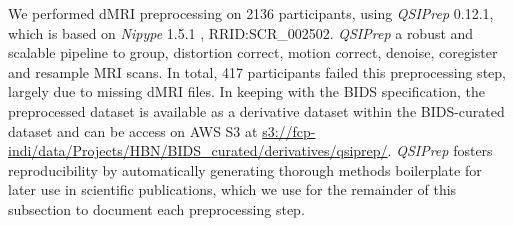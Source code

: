 \documentclass[9pt,lineno]{elife}
\begin{document}

We performed dMRI preprocessing on \num{2136} participants, using \emph{QSIPrep}
\citep{cieslak2021-iq} 0.12.1, which is based on \emph{Nipype} 1.5.1
\citep{nipype1,nipype2}, RRID:SCR\_002502. \emph{QSIPrep} a robust and scalable
pipeline to group, distortion correct, motion correct, denoise, coregister and
resample MRI scans. In total, \num{417} participants failed this preprocessing
step, largely due to missing dMRI files. 
In keeping with the BIDS specification,
the preprocessed dataset is available as a derivative dataset within the
BIDS-curated dataset and can be access on AWS S3 at
\url{s3://fcp-indi/data/Projects/HBN/BIDS_curated/derivatives/qsiprep/}.
\emph{QSIPrep} fosters reproducibility by automatically generating thorough
methods boilerplate for later use in scientific publications, which we use for
the remainder of this subsection to document each preprocessing step.
\end{document}
